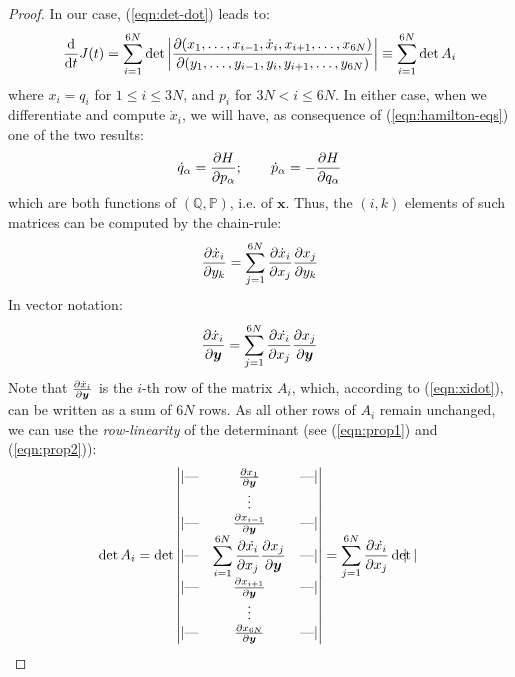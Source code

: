 \documentclass[../template.tex]{subfiles}
\begin{document}
\begin{proof}
    In our case, (\ref{eqn:det-dot}) leads to:
    \begin{align}\label{eqn:dvJ}
        \dv{t} J(t) = \sum_{i=1}^{6N} \operatorname{det}\left|\pdv{(x_1, \dots, x_{i-1}, \dot{x}_i, x_{i+1}, \dots, x_{6N})}{(y_1, \dots, y_{i-1}, y_i, y_{i+1}, \dots, y_{6N})}\right| \equiv \sum_{i=1}^{6N} \operatorname{det} A_i 
    \end{align} 
    where $x_i = q_i$ for $1 \leq i \leq 3N$, and $p_i$ for $3N < i \leq 6N$. In either case, when we differentiate and compute $\dot{x}_i$, we will have, as consequence of (\ref{eqn:hamilton-eqs}) one of the two results:
    \begin{align*}
        \dot{q}_\alpha = \pdv{H}{p_\alpha}; \qquad \dot{p}_\alpha = - \pdv{H}{q_\alpha}
    \end{align*}
    which are both functions of $(\mathbb{Q}, \mathbb{P})$, i.e. of $\bm{x}$. Thus, the $(i,k)$ elements of such matrices can be computed by the chain-rule:
    \begin{align}
        \pdv{\dot{x}_i}{y_k} = \sum_{j=1}^{6N} \pdv{\dot{x}_i}{x_j} \pdv{x_j}{y_k} 
    \end{align}
    In vector notation:
    \begin{align} \label{eqn:xidot}
        \pdv{\dot{x}_i}{\bm{y}} = \sum_{j=1}^{6N} \pdv{\dot{x_i}}{x_j} \pdv{x_j}{\bm{y}}
    \end{align}
    Note that $\pdv{\dot{x}_i}{\bm{y}}$ is the $i$-th row of the matrix $A_i$, which, according to (\ref{eqn:xidot}), can be written as a sum of $6N$ rows. As all other rows of $A_i$ remain unchanged, we can use the \textit{row-linearity} of the determinant (see (\ref{eqn:prop1}) and (\ref{eqn:prop2})):
    \begin{align*}
        \operatorname{det} A_i &= \operatorname{det} \begin{vmatrix}
            \text{|---} & \pdv{x_1}{\bm{y}} & \text{---|} \\
            & \vdots & \\
            \text{|---} & \pdv{x_{i-1}}{\bm{y}} & \text{---|}\\
            \text{|---} & \displaystyle \sum_{i=1}^{6N} \pdv{\dot{x_i}}{x_j} \pdv{x_j}{\bm{y}} & \text{---|}\\
            \text{|---} & \pdv{x_{i+1}}{\bm{y}} & \text{---|}\\
            & \vdots & \\
            \text{|---} & \pdv{x_{6N}}{\bm{y}} & \text{---|} 
        \end{vmatrix} = \sum_{j=1}^{6N} \pdv{\dot{x_i}}{x_j} \operatorname{det} \begin{vmatrix}

\end{vmatrix}
\end{align*}
\end{proof}
\end{document}
